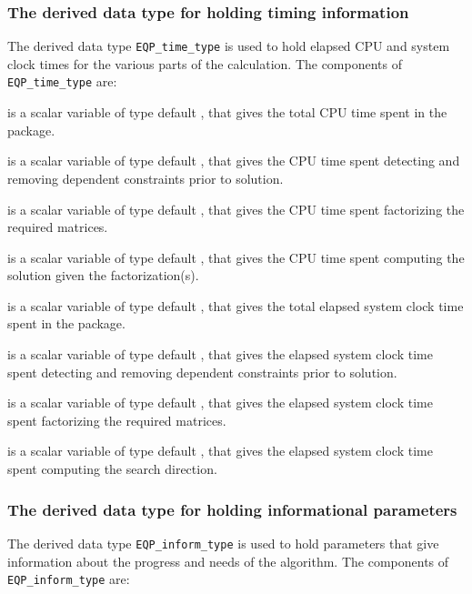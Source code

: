 \documentclass{galahad}
\newcommand{\packagename}{EQP}
\begin{document}



\subsubsection{The derived data type for holding timing 
 information}\label{typetime}
The derived data type 
{\tt \packagename\_time\_type} 
is used to hold elapsed CPU and system clock times for the various parts of 
the calculation. The components of 
{\tt \packagename\_time\_type} 
are:
\begin{description}
 is a scalar variable of type default \realdp, that gives
 the total CPU time spent in the package.

 is a scalar variable of type default \realdp, that gives
 the CPU time spent detecting and removing dependent constraints prior 
to solution.

 is a scalar variable of type default \realdp, that gives
 the CPU time spent factorizing the required matrices.

 is a scalar variable of type default \realdp, that gives
 the CPU time spent computing the solution given the factorization(s).

 is a scalar variable of type default \realdp, that gives
 the total elapsed system clock time spent in the package.

 is a scalar variable of type default \realdp, 
that gives  the elapsed system clock time spent detecting and removing 
dependent constraints prior to solution.

 is a scalar variable of type default \realdp, that gives
 the elapsed system clock time spent factorizing the required matrices.

 is a scalar variable of type default \realdp, that gives
 the elapsed system clock time spent computing the search direction.

\end{description}


\subsubsection{The derived data type for holding informational
 parameters}\label{typeinform}
The derived data type 
{\tt \packagename\_inform\_type} 
is used to hold parameters that give information about the progress and needs 
of the algorithm. The components of 
{\tt \packagename\_inform\_type} 
are:
\end{document}

